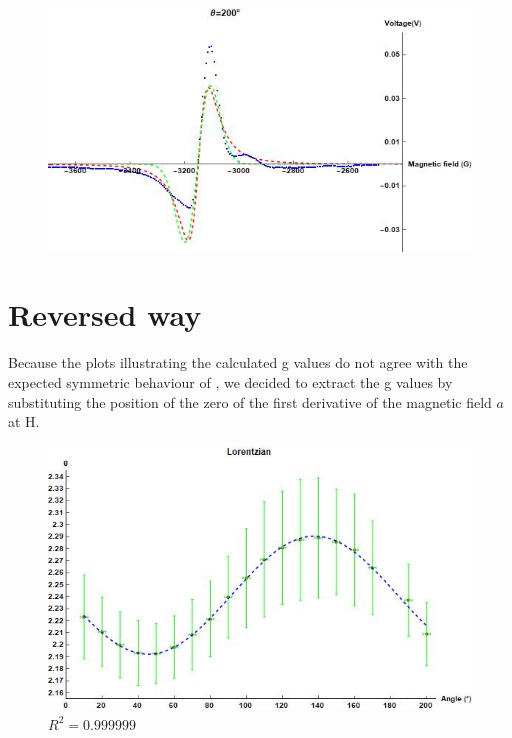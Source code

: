 \documentclass[openany,11pt,a4paper]{report}
\begin{document}
\begin{figure}[H]
\centering
\includegraphics[scale=0.6]{200.jpg}
\end{figure}

\section{Reversed way}

Because the plots illustrating the calculated g values do not agree with the expected symmetric behaviour of \cite{3.25sos}, we decided to extract the g values by substituting the position of the zero of the first derivative of the magnetic field $a$ at H.


\begin{figure}[H]
\centering
\includegraphics[scale=0.8]{glo2.jpg}
\caption{ $R^{2}=0.999999$}
\end{figure}
\end{document}
